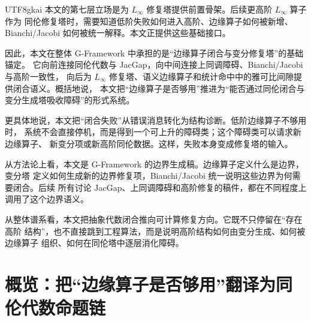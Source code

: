\documentclass[12pt]{article}
\newcommand{\GFramework}{\textsf{G-Framework}}
\begin{document}
\begin{CJK*}{UTF8}{gkai}
本文的第七层立场是为 \(L_\infty\) 修复塔提供前置骨架。后续更高阶 \(L_\infty\) 算子作为
同伦修复塔时，需要知道低阶失败如何进入高阶、边缘算子如何被新增、Bianchi/Jacobi
如何被统一解释。本文正提供这些基础接口。

因此，本文在整体 \GFramework{} 中承担的是“边缘算子闭合与变分修复塔”的基础锚定。
它向前连接同伦代数与 JacGap，向中间连接上同调障碍、Bianchi/Jacobi 与高阶一致性，
向后为 \(L_\infty\) 修复塔、语义边缘算子和统计命中中的雅可比间隙提供闭合语义。概括地说，
本文把“边缘算子是否够用”推进为“能否通过同伦闭合与变分生成塔吸收障碍”的形式系统。

更具体地说，本文把“闭合失败”从错误消息转化为结构诊断。低阶边缘算子不够用时，
系统不会直接停机，而是得到一个可上升的障碍类；这个障碍类可以请求新边缘算子、
新变分项或新高阶同伦数据。这样，失败本身变成修复塔的输入。

从方法论上看，本文是 G-Framework 的边界生成稿。边缘算子定义什么是边界，变分塔
定义如何生成新的边界修复项，Bianchi/Jacobi 统一说明这些边界为何需要闭合。后续
所有讨论 JacGap、上同调障碍和高阶修复的稿件，都在不同程度上调用了这个边界语义。

从整体谱系看，本文把抽象代数闭合推向可计算修复方向。它既不只停留在“存在高阶
结构”，也不直接跳到工程算法，而是说明高阶结构如何由变分生成、如何被边缘算子
组织、如何在同伦塔中逐层消化障碍。

\setcounter{tocdepth}{3}
\setcounter{secnumdepth}{3}
\tableofcontents
\clearpage

\section{概览：把“边缘算子是否够用”翻译为同伦代数命题链}


\end{CJK*}
\end{document}
